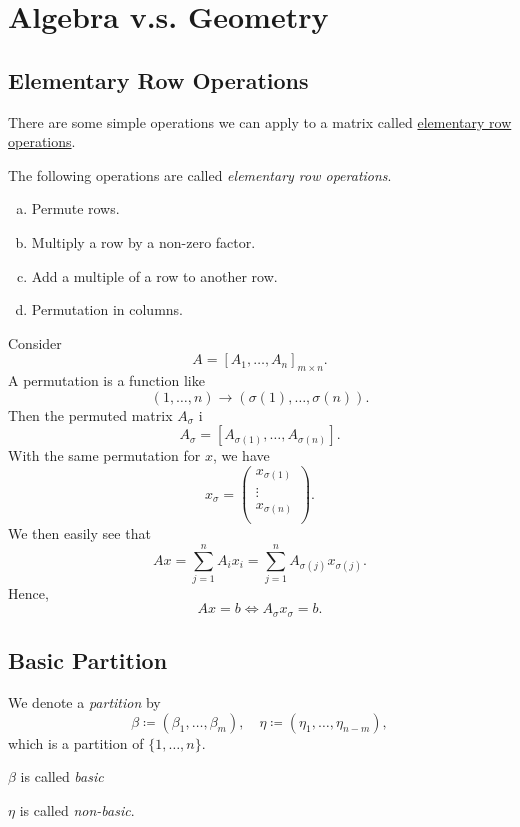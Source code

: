 \chapter{Algebra v.s. Geometry}
\section{Elementary Row Operations}
There are some simple operations we can apply to a matrix called \hyperref[def:elementary-row-operations]{elementary row operations}.
\begin{definition}\label{def:elementary-row-operations}
	The following operations are called \emph{elementary row operations}.
	\begin{enumerate}[(a)]
		\item Permute rows.
		\item Multiply a row by a non-zero factor.
		\item Add a multiple of a row to another row.
		\item Permutation in columns.
	\end{enumerate}
\end{definition}

\begin{note}
	Consider
	\[
		A = \left[ A_1, \ldots , A_n \right]_{m\times n} .
	\]
	A permutation is a function like
	\[
		(1, \ldots , n) \to (\sigma(1), \ldots , \sigma(n)).
	\]
	Then the permuted matrix \(A_{\sigma}\) i
	\[
		A_{\sigma} = \left[ A_{\sigma(1)}, \ldots , A_{\sigma(n)} \right].
	\]
	With the same permutation for \(x\), we have
	\[
		x_{\sigma} = \begin{pmatrix}
			x_{\sigma(1)} \\
			\vdots        \\
			x_{\sigma(n)} \\
		\end{pmatrix}.
	\]
	We then easily see that
	\[
		Ax = \sum\limits_{j=1}^{n} A_i x_i = \sum\limits_{j=1}^{n} A_{\sigma(j)}x_{\sigma(j)}.
	\]
	Hence,
	\[
		Ax = b \iff A_{\sigma} x_{\sigma} = b.
	\]
\end{note}

\section{Basic Partition}
\begin{definition}[Partition]\label{def:partition}
	We denote a \emph{partition} by
	\[
		\beta \coloneqq (\beta_1, \ldots , \beta_m),\quad \eta \coloneqq (\eta_1, \ldots , \eta_{n-m}),
	\]
	which is a partition of \(\{1, \ldots , n\}\).

	\begin{definition}[Basic]\label{def:basic}
		\(\beta\) is called \emph{basic}
	\end{definition}
	\begin{definition}\label{def:non-basic}
		\(\eta\) is called \emph{non-basic}.
	\end{definition}
\end{definition}

